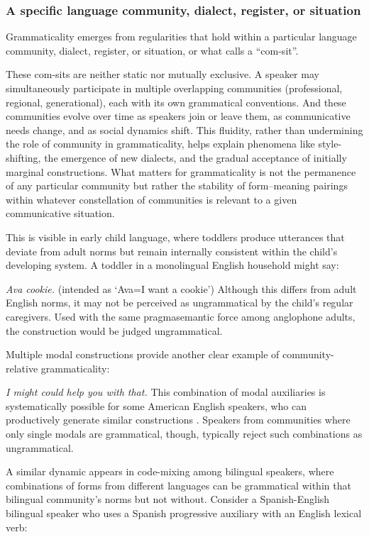 \documentclass[12pt,letterpaper]{article}
\begin{document}
\subsubsection{A specific language community, dialect, register, or situation}

Grammaticality emerges from regularities that hold within a particular language community, dialect, register, or situation, or what \textcite[3]{wiese2023} calls a ``com-sit''.

These com-sits are neither static nor mutually exclusive. A speaker may simultaneously participate in multiple overlapping communities (professional, regional, generational), each with its own grammatical conventions. And these communities evolve over time as speakers join or leave them, as communicative needs change, and as social dynamics shift. This fluidity, rather than undermining the role of community in grammaticality, helps explain phenomena like style-shifting, the emergence of new dialects, and the gradual acceptance of initially marginal constructions. What matters for grammaticality is not the permanence of any particular community but rather the stability of form--meaning pairings within whatever constellation of communities is relevant to a given communicative situation.

This is visible in early child language, where toddlers produce utterances that deviate from adult norms but remain internally consistent within the child's developing system. A toddler in a monolingual English household might say:

\ea
\textit{Ava cookie.} (intended as `Ava=I want a cookie')
\z
Although this differs from adult English norms, it may not be perceived as ungrammatical by the child's regular caregivers. Used with the same pragmasemantic force among anglophone adults, the construction would be judged ungrammatical.

Multiple modal constructions provide another clear example of community-relative grammaticality:

\ea
\textit{I might could help you with that.}
\z
This combination of modal auxiliaries is systematically possible for some American English speakers, who can productively generate similar constructions \autocite{morin2024semantics}. Speakers from communities where only single modals are grammatical, though, typically reject such combinations as ungrammatical.

A similar dynamic appears in code-mixing among bilingual speakers, where combinations of forms from different languages can be grammatical within that bilingual community’s norms but not without. Consider a Spanish-English bilingual speaker who uses a Spanish progressive auxiliary with an English lexical verb:
\end{document}
